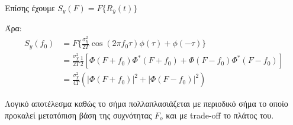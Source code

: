 \documentclass[11pt]{article}
\begin{document}
    \par \noindent
    Επίσης έχουμε $S_y(F) = F\{R_{\bar{y}}(t)\} $
    \par \noindent
    Άρα:
    \begin{align*}
        S_y(f_0) &=F\{ \frac{σ_χ^2}{2T} \cos(2\pi f_0 \tau) \phi(\tau) + \phi(-\tau) \} \\
        &= \frac{σ_χ^2}{2T} \frac{1}{2} \left[  \Phi(F+f_0)\Phi^*(F+f_0) + \Phi(F-f_0)\Phi^*(F-f_0) \right]\\
        &= \frac{σ_χ^2}{4T} \left( |\Phi(F+f_0)|^2  + |\Phi(F-f_0)|^2 \right)
    \end{align*}
    
    \par \noindent
    Λογικό αποτέλεσμα καθώς το σήμα πολλαπλασιάζεται με περιοδικό σήμα το οποίο προκαλεί μετατόπιση βάση της συχνότητας $F_o$ και με trade-off το πλάτος του.
%
%
%
\newpage
\end{document}
